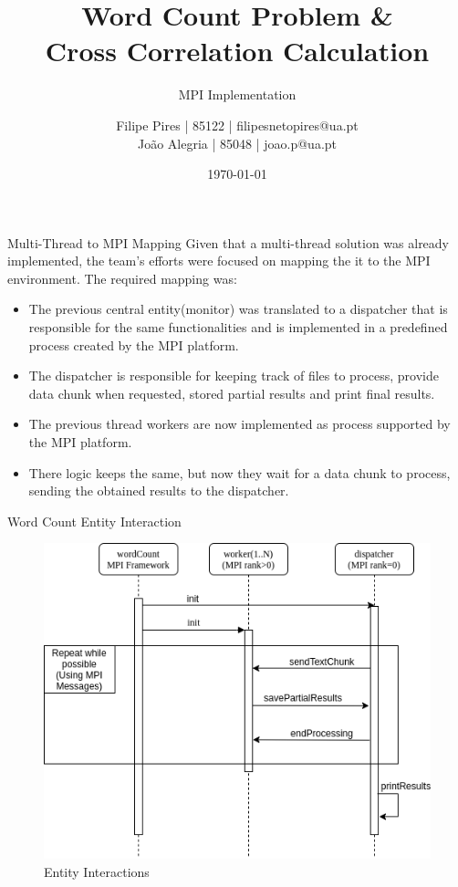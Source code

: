 \documentclass{beamer}
\title{Word Count Problem \& \\Cross Correlation Calculation}
\subtitle{MPI Implementation}
\author{Filipe Pires | 85122 | filipesnetopires@ua.pt \\ João Alegria | 85048 | joao.p@ua.pt}
\institute{University of Aveiro, DETI}
\date{\today}
\begin{document}

\begin{frame}
	\maketitle %
\end{frame}


\begin{frame}{Multi-Thread to MPI Mapping}
	Given that a multi-thread solution was already implemented, the team's efforts were focused on mapping the it to the MPI environment.
	The required mapping was:
	\begin{itemize}
		\item The previous central entity(monitor) was translated to a dispatcher that is responsible for the same functionalities and is implemented in a predefined process created by the MPI platform.
		\item The dispatcher is responsible for keeping track of files to process, provide data chunk when requested, stored partial results and print final results.
		\item The previous thread workers are now implemented as process supported by the MPI platform.
		\item There logic keeps the same, but now they wait for a data chunk to process, sending the obtained results to the dispatcher.
	\end{itemize}
\end{frame}


\begin{frame}{Word Count Entity Interaction}
	\begin{figure}
		\includegraphics[width=0.7\linewidth]{wordCountInteraction.png}
		\caption{Entity Interactions}
		\label{wordInteraction}
	\end{figure}
\end{frame}
\end{document}
